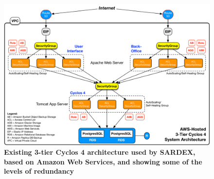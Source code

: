 \begin{figure}[htbp]
\centering
\includegraphics[width=17.5cm]{Figures/3-Tier_Cyclos_Architecture}
\caption{\small\textbf{Existing 3-tier Cyclos 4 architecture used by SARDEX, based on Amazon Web Services, and showing some of the levels of redundancy}}
\label{cyclosarchitecture}
\end{figure}










